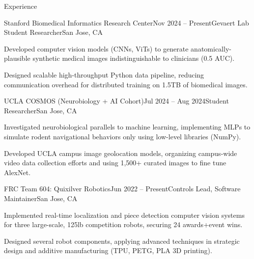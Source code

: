 \documentclass[
  10pt, %
]{resume}
\begin{document}
\sloppy


\begin{rSection}{Experience}


  \begin{rSubsection}{Stanford Biomedical Informatics Research Center}{Nov 2024 -- Present}{Gevaert Lab Student Researcher}{San Jose, CA}
    \item Developed computer vision models (CNNs, ViTs) to generate anatomically-plausible synthetic medical images indistinguishable to clinicians (0.5 AUC).
    \item Designed scalable high-throughput Python data pipeline, reducing communication overhead for distributed training on 1.5TB of biomedical images.
  \end{rSubsection}


  \begin{rSubsection}{UCLA COSMOS (Neurobiology + AI Cohort)}{Jul 2024 -- Aug 2024}{Student Researcher}{San Jose, CA}
    \item Investigated neurobiological parallels to machine learning, implementing MLPs to simulate rodent navigational behaviors only using low-level libraries (NumPy).
    \item Developed UCLA campus image geolocation models, organizing campus-wide video data collection efforts and using 1,500+ curated images to fine tune AlexNet.
  \end{rSubsection}


  \begin{rSubsection}{FRC Team 604: Quixilver Robotics}{Jun 2022 -- Present}{Controls Lead, Software Maintainer}{San Jose, CA}
    \item Implemented real-time localization and piece detection computer vision systems for three large-scale, 125lb competition robots, securing 24 awards+event wins.
    \item Designed several robot components, applying advanced techniques in strategic design and additive manufacturing (TPU, PETG, PLA 3D printing).
  \end{rSubsection}

\end{rSection}

\end{document}
